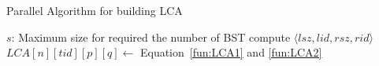 \begin{algorithm}[!thb]
  \caption{Parallel Algorithm for building LCA}
  \label{alg:parallel-LCA}
  \begin{algorithmic}[1]
    \Require
      $s$: Maximum size for required the number of BST
          \State compute $\langle\mathit{lsz},\mathit{lid},\mathit{rsz},\mathit{rid}\rangle$
            \State $\textit{LCA}[n][\mathit{tid}][p][q] \gets$ Equation~\ref{fun:LCA1} and \ref{fun:LCA2}
          \EndFor
        \EndParFor
      \EndParFor
    \EndFor
  \end{algorithmic}
\end{algorithm}